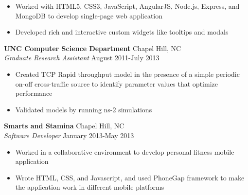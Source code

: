 \documentclass[line,margin,letterpaper]{res}
\begin{document}
\begin{resume}
  \begin{itemize} \itemsep -2pt
    \item Worked with HTML5, CSS3, JavaScript, AngularJS, Node.js, Express, and
    MongoDB to develop single-page web application
    \item Developed rich and interactive custom widgets like tooltips and
    modals
  \end{itemize}
  {\bf UNC Computer Science Department} \hfill Chapel Hill, NC \\
  \emph{Graduate Research Assistant} \hfill August 2011-July 2013
  \begin{itemize} \itemsep -2pt
    \item Created TCP Rapid throughput model in the presence of a simple 
    periodic on-off cross-traffic source to identify parameter values that 
    optimize performance
    \item Validated models by running ns-2 simulations
  \end{itemize}
  {\bf Smarts and Stamina} \hfill Chapel Hill, NC \\
  \emph{Software Developer} \hfill January 2013-May 2013
  \begin{itemize} \itemsep -2pt
    \item Worked in a collaborative environment to develop personal fitness
    mobile application
    \item Wrote HTML, CSS, and Javascript, and used PhoneGap framework to make 
    the application work in different mobile platforms
  \end{itemize}

\end{resume}
\end{document}
